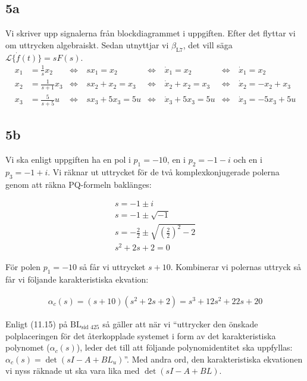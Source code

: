 \documentclass[a4paper]{article}
\newcommand{\mhb}[1]{$\beta_{\text{#1}}$}     %
\newcommand{\bl}[1]{$\text{BL}_{\text{#1}}$}  %
\begin{document}
\subsection{5a}
Vi skriver upp signalerna från blockdiagrammet i uppgiften. Efter det flyttar vi om uttrycken algebraiskt. Sedan utnyttjar vi \mhb{L7}, det vill säga $\mathcal{L}\{\dot{f}(t)\} = sF(s)$.
\begin{align*}
  x_1 & = \frac{1}{s}x_2   & \Longleftrightarrow ~ & sx_1 = x_2       & \Longleftrightarrow ~ & \dot{x}_1 = x_2       & \Longleftrightarrow ~ & \dot{x}_1 = x_2\\
  x_2 & = \frac{1}{s+1}x_3 & \Longleftrightarrow ~ & sx_2 + x_2 = x_3 & \Longleftrightarrow ~ & \dot{x}_2 + x_2 = x_3 & \Longleftrightarrow ~ & \dot{x}_2 = -x_2 + x_3\\
  x_3 & = \frac{5}{s+5}u   & \Longleftrightarrow ~ & sx_3 + 5x_3 = 5u & \Longleftrightarrow ~ & \dot{x}_3 + 5x_3 = 5u & \Longleftrightarrow ~ & \dot{x}_3 = -5x_3 + 5u
\end{align*}


\subsection{5b}
Vi ska enligt uppgiften ha en pol i $p_1 = -10$, en i $p_2 = -1 - i$ och en i $p_3 = -1 + i$. Vi räknar ut uttrycket för de två komplexkonjugerade polerna genom att räkna PQ-formeln baklänges:

\begin{align*}
  s = -1 \pm i\\
  s = -1 \pm \sqrt{-1}\\
  s = -\frac{2}{2} \pm \sqrt{\left(\frac{2}{2}\right)^2 - 2}\\
  s^2 + 2s + 2 = 0
\end{align*}

För polen $p_1 = -10$ så får vi uttrycket $s + 10$. Kombinerar vi polernas uttryck så får vi följande karakteristiska ekvation:

\begin{align*}
  \alpha_c(s) = (s + 10)(s^2 + 2s + 2) = s^3 + 12s^2 + 22s + 20
\end{align*}

Enligt (11.15) på \bl{sid 425} så gäller att när vi ``uttrycker den önskade polplaceringen för det återkopplade systemet i form av det karakteristiska polynomet ($\alpha_c(s)$), leder det till att följande polynomidentitet ska uppfyllas: $\alpha_c(s) = \det(sI -A + BL_u)$''. Med andra ord, den karakteristiska ekvationen vi nyss räknade ut ska vara lika med $\det(sI -A + BL)$.
\end{document}
